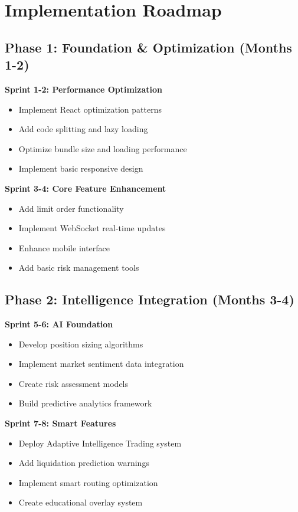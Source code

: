 \documentclass{article}
\begin{document}
\section{Implementation Roadmap}

\subsection{Phase 1: Foundation \& Optimization (Months 1-2)}

\textbf{Sprint 1-2: Performance Optimization}
\begin{itemize}[leftmargin=*]
    \item Implement React optimization patterns
    \item Add code splitting and lazy loading
    \item Optimize bundle size and loading performance
    \item Implement basic responsive design
\end{itemize}

\textbf{Sprint 3-4: Core Feature Enhancement}
\begin{itemize}[leftmargin=*]
    \item Add limit order functionality
    \item Implement WebSocket real-time updates
    \item Enhance mobile interface
    \item Add basic risk management tools
\end{itemize}

\subsection{Phase 2: Intelligence Integration (Months 3-4)}

\textbf{Sprint 5-6: AI Foundation}
\begin{itemize}[leftmargin=*]
    \item Develop position sizing algorithms
    \item Implement market sentiment data integration
    \item Create risk assessment models
    \item Build predictive analytics framework
\end{itemize}

\textbf{Sprint 7-8: Smart Features}
\begin{itemize}[leftmargin=*]
    \item Deploy Adaptive Intelligence Trading system
    \item Add liquidation prediction warnings
    \item Implement smart routing optimization
    \item Create educational overlay system
\end{itemize}
\end{document}
